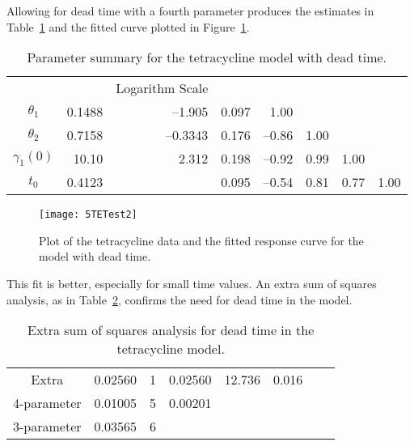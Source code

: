 \begin{example}
Allowing for dead time with a fourth parameter produces
the estimates in
Table~\ref{tbl:tetest2} and the fitted curve plotted in
Figure~\ref{fig:TETest2}.
\begin{table}
  \begin{center}
    \caption{\label{tbl:tetest2}
      Parameter summary for the tetracycline model with dead time.
      }
    \begin{tabular}{c r r r r r r r} \hline
&&Logarithm Scale\\
$\theta_{1}$&0.1488&--1.905&0.097&1.00\\
$\theta_{2}$&0.7158&--0.3343&0.176&--0.86&1.00\\
$\gamma_1 ( 0 )$&10.10&2.312&0.198&--0.92&0.99&1.00\\
$t_{0}$&0.4123&&0.095&--0.54&0.81&0.77&1.00\\ \hline
    \end{tabular}
  \end{center}
\end{table}
\begin{figure}
  \centerline{\texttt{[image: 5TETest2]}}%
  \caption{\label{fig:TETest2}
  Plot of the tetracycline data and the fitted response curve for the model
  with dead time.
  }
\end{figure}
This fit is better, especially for small time values.
An extra sum of squares analysis, as in
Table~\ref{tbl:tetlof}, confirms the need for dead time in the model.
\begin{table}
  \begin{center}
    \caption{\label{tbl:tetlof}
      Extra sum of squares analysis for dead time in the tetracycline model.
      }
    \begin{tabular}{c r r r r r r r}
Extra&0.02560&1&0.02560&12.736&0.016\\
4-parameter&0.01005&5&0.00201\\
3-parameter&0.03565&6\\ \hline
    \end{tabular}
  \end{center}
\end{table}
\end{example}

